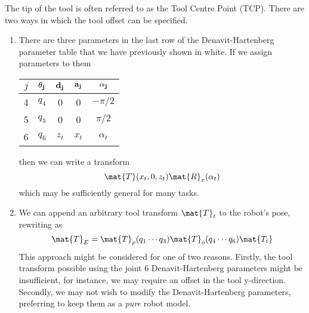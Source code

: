 \documentclass[11pt]{article}
\numberwithin{equation}{section}
\begin{document}
The tip of the tool is often referred to as the Tool Centre Point (TCP).
There are two ways in which the tool offset can be specified.
\begin{enumerate}
\item
There are three parameters in the last row of the Denavit-Hartenberg parameter table that we have previously shown in white.
If we assign parameters to them
\begin{center}
\begin{tabular}{|c|c|c|c|c|} \hline
$j$ & $\bf \theta_j$ & $\bf d_j$ & $\bf a_j$ & $\bf \alpha_j$ \\ \hline
\rowcolor{Peach}4 &  $q_4$ & 0  & 0 & $-\pi/2$ \\
\rowcolor{Peach}5 &$q_5$ & 0 & 0 & $\pi/2$ \\
\cellcolor{Peach} 6 & \cellcolor{Peach} $q_6$ & $z_t$ & $x_t$ & $\alpha_t$  \\ \hline
\end{tabular}
\end{center}
then we can write a transform
\[
\mat{T}(x_t, 0, z_t) \mat{R}_x(\alpha_t)
\]
which may be sufficiently general for many tasks.

\item We can append an arbitrary tool transform $\mat{T}_t$ to the robot's pose, rewriting   as
\[
\mat{T}_E = \mat{T}_p(q_1 \cdots q_3) \mat{T}_o(q_4 \cdots q_6)  \mat{T_t}
\]
This approach might be considered for one of two reasons.  Firstly, the tool transform possible using the joint 6 Denavit-Hartenberg parameters might be insufficient, for instance, we may require an offset in the tool y-direction.  Secondly, we may not wish to modify the Denavit-Hartenberg parameters, preferring to keep them as a \textit{pure} robot model.
\end{enumerate}



\end{document}
